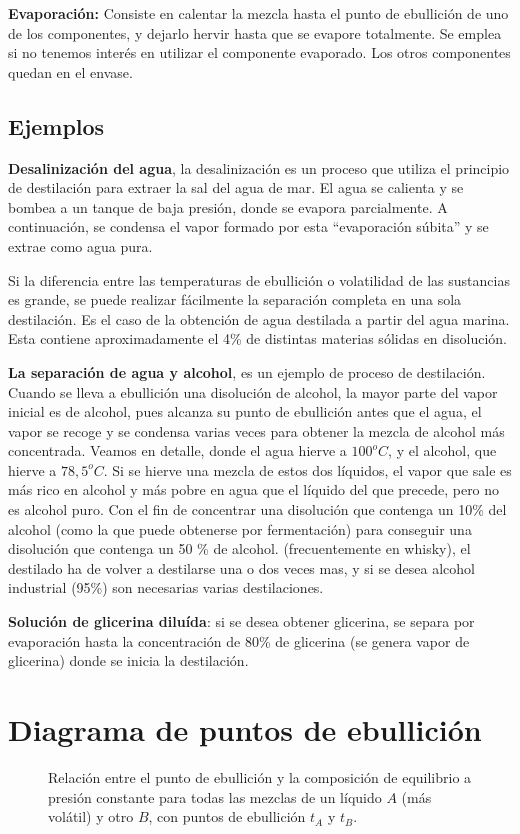 \documentclass[11pt,openany]{book}
\begin{document}
\textbf{Evaporación:} Consiste en calentar la mezcla hasta el punto de ebullición de uno de los 
componentes, y dejarlo hervir hasta que se evapore totalmente. Se emplea si no tenemos interés 
en utilizar el componente evaporado. Los otros componentes quedan en el envase.

\subsection*{Ejemplos}

\textbf{Desalinización del agua}, la desalinización es un proceso que utiliza el principio de destilación para 
extraer la sal del agua de mar. El agua se calienta y se bombea a un tanque de baja presión, donde 
se evapora parcialmente. A continuación, se condensa el vapor formado por esta ``evaporación súbita'' y se 
extrae como agua pura.

Si la diferencia entre las temperaturas de ebullición o volatilidad de las sustancias es grande, se 
puede realizar fácilmente la separación completa en una sola destilación. Es el caso de la obtención de
agua destilada a partir del agua marina. Esta contiene aproximadamente el 4\% de distintas materias 
sólidas en disolución.

\textbf{La separación de agua y alcohol}, es un ejemplo de proceso de destilación. Cuando se lleva a ebullición 
una disolución de alcohol, la mayor parte del vapor inicial es de alcohol, pues alcanza su punto de 
ebullición antes que el agua, el vapor se recoge y se condensa varias veces para obtener la mezcla de alcohol
más concentrada. Veamos en detalle, donde el agua hierve a $100^oC$, y el alcohol, que hierve a $78,5^oC$. Si 
se hierve una mezcla de estos dos líquidos, el vapor que sale es más rico en alcohol y más pobre en 
agua que el líquido del que precede, pero no es alcohol puro. Con el fin de concentrar una 
disolución que contenga un 10\% del alcohol (como la que puede obtenerse por fermentación) para 
conseguir una disolución que contenga un 50 \% de alcohol. (frecuentemente en whisky), el destilado ha 
de volver a destilarse una o dos veces mas, y si se desea alcohol industrial (95\%) son necesarias 
varias destilaciones.

\textbf{Solución de glicerina diluída}: si se desea obtener glicerina, se separa por evaporación hasta la 
concentración de 80\% de glicerina (se genera vapor de glicerina) donde se inicia la destilación.

\section{Diagrama de puntos de ebullición}
\begin{figure}[h]

\caption{Relación entre el punto de ebullición y la composición de equilibrio a presión constante para todas las 
mezclas de un líquido $A$ (más volátil) y otro $B$, con puntos de ebullición $t_A$ y $t_B$.
}
\end{figure}
\end{document}
